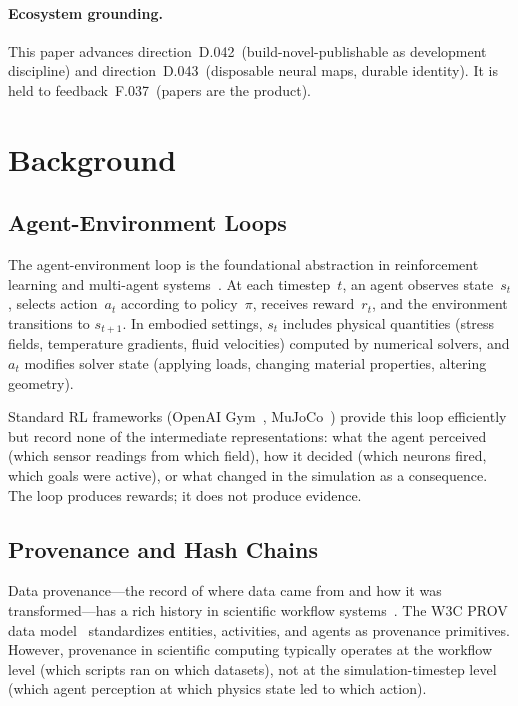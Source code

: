 \documentclass[sigconf,nonacm]{acmart}
\begin{document}

\paragraph{Ecosystem grounding.} This paper advances direction~D.042~(build-novel-publishable as development discipline) and direction~D.043~(disposable neural maps, durable identity). It is held to feedback~F.037~(papers are the product).

\section{Background}
\label{sec:background}

\subsection{Agent-Environment Loops}

The agent-environment loop is the foundational abstraction in reinforcement
learning and multi-agent systems~\cite{sutton2018rl}. At each timestep~$t$,
an agent observes state~$s_t$, selects action~$a_t$ according to
policy~$\pi$, receives reward~$r_t$, and the environment transitions to
$s_{t+1}$. In embodied settings, $s_t$ includes physical quantities
(stress fields, temperature gradients, fluid velocities) computed by
numerical solvers, and $a_t$ modifies solver state (applying loads,
changing material properties, altering geometry).

Standard RL frameworks (OpenAI Gym~\cite{gym2016}, MuJoCo~\cite{mujoco2012})
provide this loop efficiently but record none of the intermediate
representations: what the agent perceived (which sensor readings from which
field), how it decided (which neurons fired, which goals were active), or
what changed in the simulation as a consequence. The loop produces rewards;
it does not produce evidence.

\subsection{Provenance and Hash Chains}

Data provenance---the record of where data came from and how it was
transformed---has a rich history in scientific workflow
systems~\cite{buneman2001provenance, moreau2013prov}. The W3C PROV data
model~\cite{w3c-prov} standardizes entities, activities, and agents as
provenance primitives. However, provenance in scientific computing typically
operates at the workflow level (which scripts ran on which datasets), not
at the simulation-timestep level (which agent perception at which physics
state led to which action).
\end{document}
